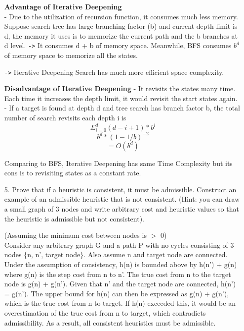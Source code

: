 \documentclass{article}
\begin{document}
\begin{enumerate}
\textbf{Advantage of Iterative Deepening}\\
- Due to the utilization of recursion function, it consumes much less memory.
Suppose search tree has large branching factor (b) and current depth limit is d, the memory it uses is to memorize the current path and the b branches at d level.
\verb|->| It consumes d + b of memory space.
Meanwhile, BFS consumes $b^d$ of memory space to memorize all the states.

\verb|->| Iterative Deepening Search has much more efficient space complexity.

\textbf{Disadvantage of Iterative Deepening}
- It revisits the states many time. Each time it increases the depth limit, it would revisit the start states again.\\
- If a target is found at depth d and tree search has branch factor b, the total number of search revisits each depth i is 
\[ \Sigma_{i=0}^d (d-i+1) \ast b^i \]
\[ b^d \ast (1 - 1/b)^{-2} \]
\[ = O(b^d)\]

Comparing to BFS, Iterative Deepening has same Time Complexity but its cons is to revisiting states as a constant rate.

\item[5.]
Prove that if a heuristic is consistent, it must be admissible. Construct an example of an admissible
heuristic that is not consistent. (Hint: you can draw a small graph of 3 nodes and write arbitrary cost and heuristic values
so that the heuristic is admissible but not consistent).

(Assuming the minimum cost between nodes is $>$ 0)\\
Consider any arbitrary graph G and a path P with no cycles consisting of 3 nodes \{n, n', target node\}.  Also assume n and target node are connected.  Under the assumption of consistency, h(n) is bounded above by h(n') + g(n) where g(n) is the step cost from n to n'.  The true cost from n to the target node is g(n) + g(n').  Given that n' and the target node are connected, h(n') = g(n').  The upper bound for h(n) can then be expressed as g(n) + g(n'), which is the true cost from n to target.  If h(n) exceeded this, it would be an overestimation of the true cost from n to target, which contradicts admissibility.  As a result, all consistent heuristics must be admissible.

\end{enumerate}
\end{document}
